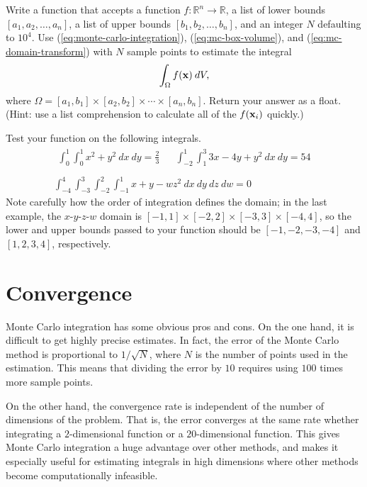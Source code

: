 \begin{problem}
Write a function that accepts a function $f:\mathbb{R}^n\rightarrow\mathbb{R}$, a list of lower bounds $[a_1, a_2, \ldots, a_n]$, a list of upper bounds $[b_1, b_2, \ldots, b_n]$, and an integer $N$ defaulting to $10^4$.
Use (\ref{eq:monte-carlo-integration}), (\ref{eq:mc-box-volume}), and (\ref{eq:mc-domain-transform}) with $N$ sample points to estimate the integral
\[
\int_\Omega f(\mathbf{x})\:dV,
\]
where $\Omega = [a_1,b_1]\times[a_2,b_2]\times\cdots\times[a_n,b_n]$. Return your answer as a float.
\\(Hint: use a list comprehension to calculate all of the $f(\mathbf{x}_i)$ quickly.)

Test your function on the following integrals.
\[
\begin{array}{c}
    \begin{array}{ccc}
    \displaystyle\int_0^1\int_0^1 x^2 + y^2\:dx\:dy = \frac{2}{3}
    & &
    \displaystyle\int_{-2}^1\int_1^3 3x - 4y + y^2\:dx\:dy = 54
    \end{array}
\\ \\
\displaystyle\int_{-4}^4\int_{-3}^3\int_{-2}^2\int_{-1}^1 x + y - w z^2\:dx\:dy\:dz\:dw = 0
\end{array}
\]
Note carefully how the order of integration defines the domain; in the last example, the $x$-$y$-$z$-$w$ domain is $[-1,1]\times[-2,2]\times[-3,3]\times[-4,4]$, so the lower and upper bounds passed to your function should be $[-1, -2, -3, -4]$ and $[1, 2, 3, 4]$, respectively.
\label{prob:montecarlo-integration-nd}
\end{problem}

\section*{Convergence} %

Monte Carlo integration has some obvious pros and cons.
On the one hand, it is difficult to get highly precise estimates.
In fact, the error of the Monte Carlo method is proportional to $1/\sqrt{N}$, where $N$ is the number of points used in the estimation.
This means that dividing the error by $10$ requires using $100$ times more sample points.

On the other hand, the convergence rate is independent of the number of dimensions of the problem.
That is, the error converges at the same rate whether integrating a $2$-dimensional function or a $20$-dimensional function.
This gives Monte Carlo integration a huge advantage over other methods, and makes it especially useful for estimating integrals in high dimensions where other methods become computationally infeasible.

